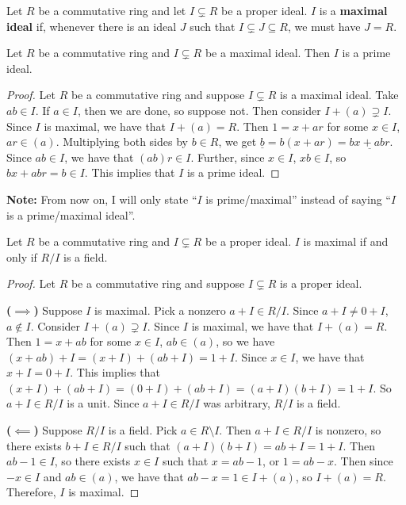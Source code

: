 \documentclass [12pt] {article}
\newenvironment{definition}[1]{\begin{tcolorbox}[title={Definition: #1},colback=blue!5!white,colframe=black!75!blue]}{\end{tcolorbox}}
\newenvironment{theorem}[1]{\begin{tcolorbox}[title={Theorem #1},colback=green!5!white,colframe=black!75!green]}{\end{tcolorbox}}
\renewcommand{\bf}[1]{\textbf{{#1}}}
\newcommand{\ul}[1]{\underline{{#1}}}
\begin{document}
\begin{definition}{Maximal Ideal}
    Let $R$ be a commutative ring and let $I \subsetneq R$ be a proper ideal. $I$ is a
    \bf{maximal ideal} if, whenever there is an ideal $J$ such that $ I \subsetneq J \subseteq R$,
    we must have $J = R$.
\end{definition}

\begin{theorem}{}
    Let $R$ be a commutative ring and $I \subsetneq R$ be a maximal ideal. Then $I$ is a prime ideal.
\end{theorem}
\begin{proof}
    Let $R$ be a commutative ring and suppose $I \subsetneq R$ is a maximal ideal. Take $ab \in I$.
    If $a \in I$, then we are done, so suppose not. Then consider $I + (a) \supsetneq I$. Since $I$
    is maximal, we have that $I + (a) = R$. Then $1 = x + ar$ for some $x \in I$, $ar \in (a)$.
    Multiplying both sides by $b \in R$, we get $\ul{b} = b(x + ar) = \ul{bx + abr}$. Since
    $ab \in I$, we have that $(ab)r \in I$. Further, since $x \in I$, $xb \in I$, so
    $bx + abr = b \in I$. This implies that $I$ is a prime ideal.
\end{proof}
\bf{Note:} From now on, I will only state ``$I$ is prime/maximal'' instead of saying ``$I$ is a
prime/maximal ideal''.

\begin{theorem}{}
    Let $R$ be a commutative ring and $I \subsetneq R$ be a proper ideal. $I$ is maximal if and only
    if $R/I$ is a field.
\end{theorem}
\begin{proof}
    Let $R$ be a commutative ring and suppose $I \subsetneq R$ is a proper ideal.
    \vspace{0.5em}

    \bf{($\bm{\implies}$)}
    Suppose $I$ is maximal. Pick a nonzero $a + I \in R/I$. Since $a + I \neq 0 + I$, $a
    \not \in I$. Consider $I + (a) \supsetneq I$. Since $I$ is maximal, we have that $I + (a) = R$.
    Then $1 = x + ab$ for some $x \in I$, $ab \in (a)$, so we have
    $(x + ab) + I = (x + I) + (ab + I) = 1 + I$. Since $x \in I$, we have that $x + I = 0 + I$.
    This implies that $(x + I) + (ab + I) = (0 + I) + (ab + I) = (a + I)(b + I) = 1 + I$. So
    $a + I \in R/I$ is a unit. Since $a + I \in R/I$ was arbitrary, $R/I$ is a field.
    \vspace{0.5em}

    \bf{($\bm{\impliedby}$)}
    Suppose $R/I$ is a field. Pick $a \in R \setminus I$. Then $a + I \in R/I$ is nonzero, so there
    exists $b + I \in R/I$ such that $(a + I)(b + I) = ab + I = 1 + I$. Then $ab - 1 \in I$, so
    there exists $x \in I$ such that $x = ab - 1$, or $1 = ab - x$. Then since $-x \in I$ and
    $ab \in (a)$, we have that $ab - x = 1 \in I + (a)$, so $I + (a) = R$. Therefore, $I$ is maximal.
\end{proof}
\end{document}
